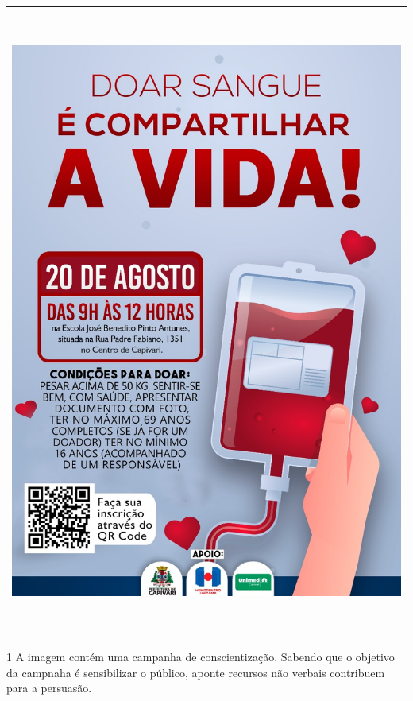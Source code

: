 \begin{longtable}[]{@{}l@{}}
\toprule
\endhead
\includegraphics[width=5.76042in,height=8.15278in]{./imgSAEB_7_POR/media/image1.png} \\
\bottomrule
\end{longtable}


\num{1} A imagem contém uma campanha de conscientização. Sabendo que
o objetivo da campnaha é sensibilizar o público, aponte
recursos não verbais contribuem para a persuasão.

